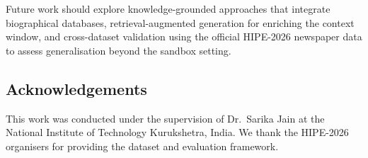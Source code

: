 Future work should explore knowledge-grounded approaches that integrate biographical databases, retrieval-augmented generation for enriching the context window, and cross-dataset validation using the official HIPE-2026 newspaper data to assess generalisation beyond the sandbox setting.

\subsection*{Acknowledgements}

This work was conducted under the supervision of Dr.~Sarika Jain at the National Institute of Technology Kurukshetra, India. We thank the HIPE-2026 organisers for providing the dataset and evaluation framework.


